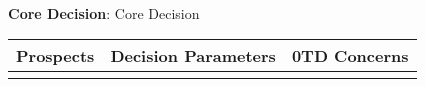 \documentclass{article}
\begin{document}
\noindent
{}
\\

\vspace{0.3cm}
{\hfill}\large{\textbf{Core Decision}: Core Decision}{\hfill}
\vspace{0.17cm}
\noindent
\begin{center}
    \begin{tabular}{|p{}|p{}|p{}|}
        \hline
        \vspace{0.01cm}{\hfill}\textbf{Prospects}{\hfill}\vspace{0.1cm} & \vspace{0.01cm}{\hfill}\textbf{Decision Parameters}{\hfill}\vspace{0.1cm} & \vspace{0.01cm}{\hfill}\textbf{0TD Concerns}{\hfill}\vspace{0.1cm} \\
        \hline
        \vspace{0.1cm}
        \begin{minipage}[t]{0.3\textwidth}
        \end{minipage}
        \vspace{0.1cm} &
        \vspace{0.1cm}
        \begin{minipage}[t]{0.3\textwidth}
        \end{minipage}
        \vspace{0.1cm} &
        \vspace{0.1cm}
        \begin{minipage}[t]{0.3\textwidth}
        \end{minipage}
        \vspace{0.1cm}
        \\
        \hline
    \end{tabular}
\end{center}
\vspace{1cm}
\end{document}
